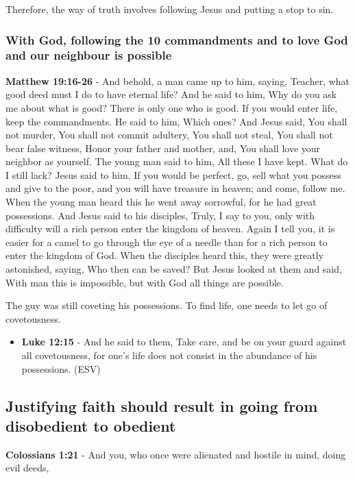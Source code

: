 \documentclass[11pt]{article}
\begin{document}
Therefore, the way of truth involves following Jesus and putting a stop to sin.

\subsubsection{With God, following the 10 commandments and to love God and our neighbour is possible}
\label{sec:org60ece32}

\textbf{Matthew 19:16-26} - And behold, a man came up to him, saying, Teacher, what good deed must I do to have eternal life? And he said to him, Why do you ask me about what is good? There is only one who is good. If you would enter life, keep the commandments. He said to him, Which ones? And Jesus said, You shall not murder, You shall not commit adultery, You shall not steal, You shall not bear false witness, Honor your father and mother, and, You shall love your neighbor as yourself. The young man said to him, All these I have kept. What do I still lack? Jesus said to him, If you would be perfect, go, sell what you possess and give to the poor, and you will have treasure in heaven; and come, follow me. When the young man heard this he went away sorrowful, for he had great possessions. And Jesus said to his disciples, Truly, I say to you, only with difficulty will a rich person enter the kingdom of heaven. Again I tell you, it is easier for a camel to go through the eye of a needle than for a rich person to enter the kingdom of God. When the disciples heard this, they were greatly astonished, saying, Who then can be saved? But Jesus looked at them and said, With man this is impossible, but with God all things are possible.

The guy was still coveting his possessions. To find life, one needs to let go of covetousness.

\begin{itemize}
\item \textbf{Luke 12:15} - And he said to them, Take care, and be on your guard against all covetousness, for one's life does not consist in the abundance of his possessions. (ESV)
\end{itemize}

\subsection{Justifying faith should result in going from disobedient to obedient}
\label{sec:org4de0907}
\textbf{Colossians 1:21} - And you, who once were alienated and hostile in mind, doing evil deeds,
\end{document}
